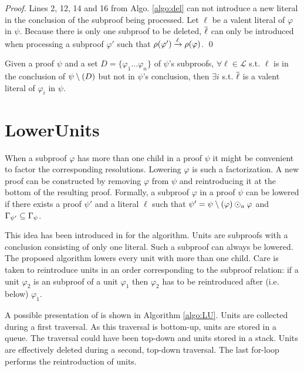 \documentclass{llncs}
\begin{document}
\newcommand{\pedge}[3]{\ensuremath{\raiz{#1} \xrightarrow{#2} \raiz{#3}}}

\begin{proof}
Lines 2, 12, 14 and 16 from Algo. \ref{algo:del} can not introduce a new literal in the conclusion of
the subproof being processed. Let $\ell$ be a valent literal of $\varphi$ in $\psi$. Because
there is only one subproof to be deleted, $\overline{\ell}$ can only be introduced when processing a
subproof $\varphi'$ such that $\pedge{\varphi'}{\ell}{\varphi}$. \qed
\end{proof}

\begin{proposition}
Given a proof $\psi$ and a set $D = \{\varphi_1 \ldots \varphi_n\}$ of $\psi$'s subproofs, $\forall
\ell \in \mathcal{L}$ s.t. $\ell$ is in the conclusion of $\psi \setminus (D)$ but not in $\psi$'s
conclusion, then $\exists i$ s.t. $\overline{\ell}$ is a valent literal of $\varphi_i$ in $\psi$.
\end{proposition}


\section{LowerUnits} \label{sec:LU}

When a subproof $\varphi$ has more than one child in a proof $\psi$ it might be convenient to factor
the corresponding resolutions. Lowering $\varphi$ is such a factorization. A new proof can be
constructed by removing $\varphi$ from $\psi$ and reintroducing it at the bottom of the resulting
proof. Formally, a subproof $\varphi$ in a proof $\psi$ can be lowered if there exists a proof
$\psi'$ and a literal $\ell$ such that $\psi' = \psi \setminus (\varphi) \odot_a \varphi$ and
$\Gamma_{\psi'} \subseteq \Gamma_{\psi}$.

This idea has been introduced in \cite{LURPI} for the {\LowerUnits} algorithm. Units are subproofs
with a conclusion consisting of only one literal. Such a subproof can always be lowered. The
proposed algorithm lowers every unit with more than one child. Care is taken to reintroduce units in
an order corresponding to the subproof relation: if a unit $\varphi_2$ is an subproof of a unit
$\varphi_1$ then $\varphi_2$ has to be reintroduced after (i.e. below) $\varphi_1$.

A possible presentation of {\LowerUnits} is shown in Algorithm \ref{algo:LU}. Units are collected
during a first traversal. As this traversal is bottom-up, units are stored in a queue. The traversal
could have been top-down and units stored in a stack. Units are effectively deleted during a second,
top-down traversal. The last for-loop performs the reintroduction of units.
\end{document}

